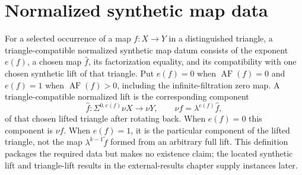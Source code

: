 \section{Normalized synthetic map data}

\begin{definition}
  \label{def:synthetic-hat-map}
  \notready
  For a selected occurrence of a map $f:X\to Y$ in a distinguished triangle,
  a triangle-compatible normalized synthetic map datum consists of the
  exponent $e(f)$, a chosen map $\widehat f$, its factorization equality, and
  its compatibility with one chosen synthetic lift of that triangle.  Put
  $e(f)=0$ when
  $\operatorname{AF}(f)=0$ and $e(f)=1$ when
  $\operatorname{AF}(f)>0$, including the infinite-filtration zero map.  A
  triangle-compatible normalized lift is the corresponding component
  \[
    \widehat f:\Sigma^{0,e(f)}\nu X\longrightarrow\nu Y,
    \qquad \nu f=\lambda^{e(f)}\widehat f,
  \]
  of that chosen lifted triangle after rotating back.  When $e(f)=0$
  this component is $\nu f$.  When $e(f)=1$, it is the particular component of
  the lifted triangle, not the map $\lambda^{k-1}\widetilde f$ formed from an
  arbitrary full lift.  This definition packages the required data but makes
  no existence claim; the located synthetic lift and triangle-lift results in
  the external-results chapter supply instances later.
\end{definition}

